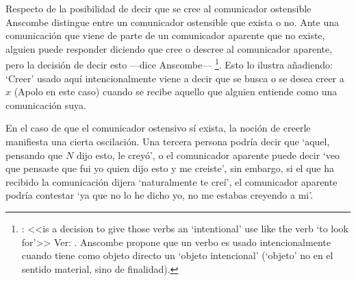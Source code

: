 Respecto de la posibilidad de decir que se cree al comunicador ostensible Anscombe distingue entre un comunicador ostensible que exista o no. Ante una comunicación que viene de parte de un comunicador aparente que no existe, alguien puede responder diciendo que cree o descree al comunicador aparente, pero la decisión de decir esto ---dice Anscombe--- \footnote{\cite[7]{anscombe2008faith:tobelieve}: <<is a decision to give those verbs an `intentional' use like the verb `to look for'>> Ver: \cite{anscombe1981metaphysics:intsens}. Anscombe propone que un verbo es usado intencionalmente cuando tiene como objeto directo un `objeto intencional' (`objeto' no en el sentido material, sino de finalidad).}. Esto lo ilustra añadiendo:  `Creer' usado aquí intencionalmente viene a decir que se busca o se desea creer a $x$ (Apolo en este caso) cuando se recibe aquello que alguien entiende como una comunicación suya.

En el caso de que el comunicador ostensivo sí exista, la noción de creerle manifiesta una cierta oscilación. Una tercera persona podría decir que `aquel, pensando que $N$ dijo esto, le creyó', o el comunicador aparente puede decir `veo que pensaste que fui yo quien dijo esto y me creiste', sin embargo, si el que ha recibido la comunicación dijera `naturalmente te creí', el comunicador aparente podría contestar `ya que no lo he dicho yo, no me estabas creyendo a mi'\autocite[Cf.~][8]{anscombe2008faith:tobelieve}.

